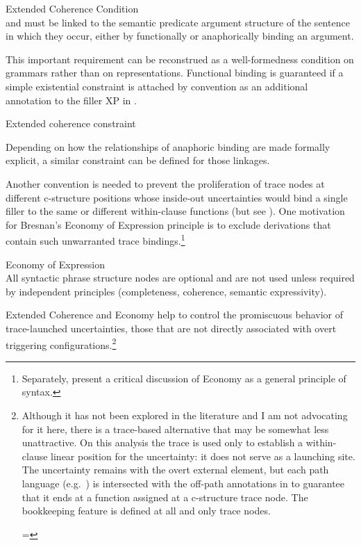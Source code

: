 \documentclass[output=paper,hidelinks]{langscibook}
\begin{document}
\newpage
\ea \label{coherence}Extended Coherence Condition\\
\FOCUS and \TOPIC must be linked to the semantic predicate argument structure of the sentence in which they occur, either by functionally or anaphorically binding an argument. 
\z

\noindent   This important requirement can be reconstrued as a well-formedness condition on grammars rather than on representations.  Functional binding is guaranteed if a simple existential constraint  is attached by convention as an additional annotation to the filler XP in  . 

\ea\label{coherenceconstraint}Extended coherence constraint\\
\z

\noindent  Depending on how the relationships of anaphoric binding are made formally explicit, a similar constraint can be defined for those linkages.

Another convention is needed to prevent the proliferation of trace nodes at different c-structure positions whose inside-out uncertainties would bind a single filler to the same or different within-clause functions (but see ).  One motivation for Bresnan's Economy of Expression principle  is to exclude derivations that contain such unwarranted trace bindings.\footnote{Separately, \citet{Dalrympleetal2015} present a critical discussion of Economy as a general principle of syntax.} 

\ea\label{economy}Economy of Expression \hsp{1em}\citep{BresnanEtAl2016}\\ 
All syntactic phrase structure nodes are optional and are not used unless required by independent principles (completeness, coherence, semantic expressivity).
\z

\noindent  Extended Coherence and Economy help to control the promiscuous behavior of trace-launched uncertainties, those that are not directly associated with overt triggering configurations.\footnote{Although it has not been explored in the literature and I am not advocating for it here, there is a trace-based alternative that may be somewhat less unattractive.  On this analysis the trace is used only to establish a within-clause linear position for the uncertainty: it does not serve as a launching site. The uncertainty remains with the overt external element, but each path language (e.g.\ ) is intersected with the off-path annotations in    to guarantee that it ends at a function assigned at a c-structure trace node. The bookkeeping feature  is defined at all and only trace nodes. 

\ea\label{locate}
   = 
\hsp{3em}  %
      {\hsp{-.75em}}
\z
}
\end{document}
